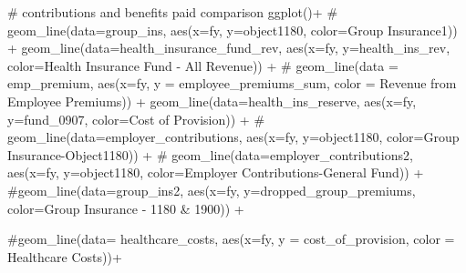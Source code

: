 \documentclass[
  letterpaper,
  DIV=11,
  numbers=noendperiod]{scrreport}
\newenvironment{Shaded}{\begin{snugshade}}{\end{snugshade}}
\newcommand{\AttributeTok}[1]{\textcolor[rgb]{0.40,0.45,0.13}{#1}}
\newcommand{\CommentTok}[1]{\textcolor[rgb]{0.37,0.37,0.37}{#1}}
\newcommand{\FunctionTok}[1]{\textcolor[rgb]{0.28,0.35,0.67}{#1}}
\newcommand{\NormalTok}[1]{\textcolor[rgb]{0.00,0.23,0.31}{#1}}
\newcommand{\SpecialCharTok}[1]{\textcolor[rgb]{0.37,0.37,0.37}{#1}}
\newcommand{\StringTok}[1]{\textcolor[rgb]{0.13,0.47,0.30}{#1}}
\begin{document}
\begin{Shaded}
\begin{Highlighting}[]
\CommentTok{\# contributions and benefits paid comparison}
\FunctionTok{ggplot}\NormalTok{()}\SpecialCharTok{+}
  \CommentTok{\#  geom\_line(data=group\_ins, aes(x=fy, y=object1180, color=\textquotesingle{}Group Insurance1\textquotesingle{})) +}
      \FunctionTok{geom\_line}\NormalTok{(}\AttributeTok{data=}\NormalTok{health\_insurance\_fund\_rev, }\FunctionTok{aes}\NormalTok{(}\AttributeTok{x=}\NormalTok{fy, }\AttributeTok{y=}\NormalTok{health\_ins\_rev, }\AttributeTok{color=}\StringTok{\textquotesingle{}Health Insurance Fund {-} All Revenue\textquotesingle{}}\NormalTok{)) }\SpecialCharTok{+}
\CommentTok{\# geom\_line(data = emp\_premium, aes(x=fy, y = employee\_premiums\_sum, color = \textquotesingle{}Revenue from Employee Premiums\textquotesingle{})) +}
    \FunctionTok{geom\_line}\NormalTok{(}\AttributeTok{data=}\NormalTok{health\_ins\_reserve, }\FunctionTok{aes}\NormalTok{(}\AttributeTok{x=}\NormalTok{fy, }\AttributeTok{y=}\NormalTok{fund\_0907, }\AttributeTok{color=}\StringTok{\textquotesingle{}Cost of Provision\textquotesingle{}}\NormalTok{)) }\SpecialCharTok{+}
  \CommentTok{\#  geom\_line(data=employer\_contributions, aes(x=fy, y=object1180, color=\textquotesingle{}Group Insurance{-}Object1180\textquotesingle{})) +}
 \CommentTok{\#   geom\_line(data=employer\_contributions2, aes(x=fy, y=object1180, color=\textquotesingle{}Employer Contributions{-}General Fund\textquotesingle{})) +}
  \CommentTok{\#geom\_line(data=group\_ins2, aes(x=fy, y=dropped\_group\_premiums, color=\textquotesingle{}Group Insurance {-} 1180 \& 1900\textquotesingle{})) +}

  \CommentTok{\#geom\_line(data= healthcare\_costs, aes(x=fy, y = cost\_of\_provision, color = \textquotesingle{}Healthcare Costs\textquotesingle{}))+ }


\end{Highlighting}
\end{Shaded}
\end{document}
